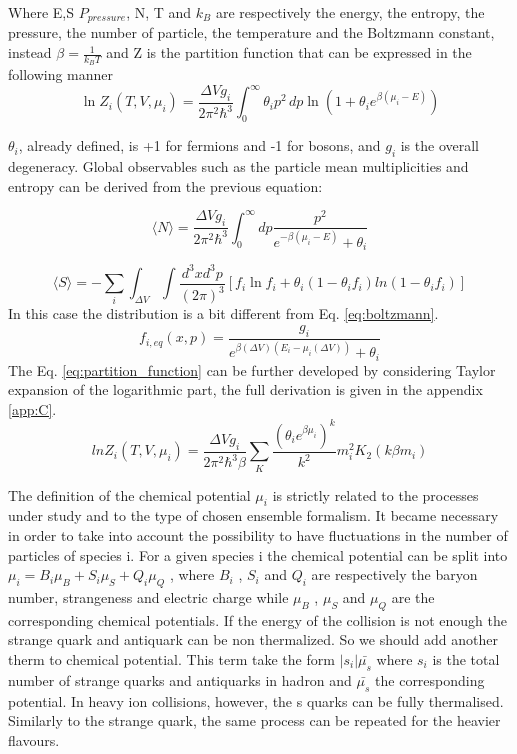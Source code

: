 \documentclass[12pt,a4paper]{book}
\begin{document}
	
	Where E,S $P_{pressure}$, N, T and $k_B$ are respectively the energy, the entropy, the pressure, the number of particle, the temperature and the Boltzmann constant, instead $\beta=\frac{1}{k_BT}$ and Z is the partition function that can be expressed in the following manner
\begin{equation}
	\boxed{
		\ln Z_i(T,V,\mu_i) = \frac{\Delta V g_i}{2\pi^2 \hbar^3} \int_{0}^{\infty} \theta_i p^2 \, dp \ln \left( 1 + \theta_i e^{\beta(\mu_i - E)} \right) }
	\label{eq:partition_function}
\end{equation}

$\theta_i$, already defined, is +1 for fermions and -1 for bosons, and $g_i$ is the overall degeneracy. Global observables such as the particle mean multiplicities and entropy can be derived from the previous equation:

\begin{equation}
	\boxed{
		\langle N \rangle = \frac{\Delta V g_i}{2\pi^2 \hbar^3} \int_{0}^{\infty} dp \frac{p^2}{e^{-\beta(\mu_i - E)} + \theta_i}}
	\label{eq:mean_particle_number}
\end{equation}

	\begin{equation}
		\langle S \rangle= -\sum_{i} \int_{\Delta V} \int \frac{d^3x d^3p}{(2\pi)^3} \left[f_i \ln f_i + \theta_i (1-\theta_if_i)ln(1-\theta_if_i) \right]
		\label{eq:entropy}
	\end{equation}
	In this case the distribution is a bit different from Eq. \ref{eq:boltzmann}.
	\begin{equation}
		f_{i,eq}(x,p)=\frac{g_i}{e^{\beta(\Delta V)(E_i-\mu_i(\Delta V))} +\theta_i} 
		\label{eq:boltmann2}
	\end{equation}
	The Eq. \ref{eq:partition_function} can be further developed by considering  Taylor expansion of the logarithmic part, the full derivation is given in the appendix \ref{app:C}.
	\begin{equation}
		ln Z_i(T,V,\mu_i)= \frac{\Delta V g_i}{2\pi^2\hbar^3\beta} \sum_{K} \frac{(\theta_i e^{\beta \mu_i})^k}{k^2} m_i^2K_2(k\beta m_i)
		\label{eq:partition_function2}
	\end{equation}
	
	The definition of the chemical potential $\mu_i$ is strictly related to the processes under study and to the type of chosen ensemble formalism. It became necessary in order to take into account the possibility to have fluctuations in the number of particles of species i. For a given species i the chemical potential can be split into $\mu_i = B_i \mu_B + S_i \mu_S + Q_i \mu_Q$ , where $B_i$ , $S_i$ and $Q_i$ are respectively the baryon number, strangeness and electric charge while $\mu_B$ , $\mu_S$ and $\mu_Q$ are the corresponding chemical potentials. If the energy of the collision is not enough the strange quark and antiquark can be non thermalized. So we should add another therm to chemical potential. This term take the form $|s_i| \bar{\mu_s}$ where $s_i$ is the total number of strange quarks and antiquarks in hadron and $\bar{\mu_s}$ the corresponding potential. In heavy ion collisions, however, the s quarks can be fully thermalised. Similarly to the strange quark, the same process can be repeated for the heavier flavours.
	
\end{document}
